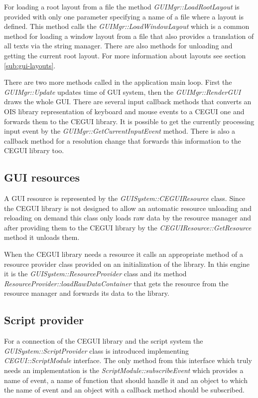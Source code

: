For loading a root layout from a file the method \emph{GUIMgr::LoadRootLayout} is provided with only one parameter specifying a name of a file where a layout is defined. This method calls the \emph{GUIMgr::LoadWindowLayout} which is a common method for loading a window layout from a file that also provides a translation of all texts via the string manager. There are also methods for unloading and getting the current root layout. For more information about layouts see section \ref{sub:gui-layouts}.

There are two more methods called in the application main loop. First the \emph{GUIMgr::Update} updates time of GUI system, then the \emph{GUIMgr::Render\-GUI} draws the whole GUI. There are several input callback methods that converts an OIS library representation of keyboard and mouse events to a CEGUI one and forwards them to the CEGUI library. It is possible to get the currently processing input event by the \emph{GUIMgr::GetCurrentInputEvent} method. There is also a callback method for a resolution change that forwards this information to the CEGUI library too.

\subsection{GUI resources}
\label{sub:gui-resources}

A GUI resource is represented by the \emph{GUISystem::CEGUIResource} class. Since the CEGUI library is not designed to allow an automatic resource unloading and reloading on demand this class only loads raw data by the resource manager and after providing them to the CEGUI library by the \emph{CEGUIResource::GetResource} method it unloads them.

When the CEGUI library needs a resource it calls an appropriate method of a resource provider class provided on an initialization of the library. In this engine it is the \emph{GUISystem::ResourceProvider} class and its method \emph{ResourceProvider::loadRawDataContainer} that gets the resource from the resource manager and forwards its data to the library.

\subsection{Script provider}
\label{sub:gui-script}

For a connection of the CEGUI library and the script system the \emph{GUISystem::ScriptProvider} class is introduced implementing \emph{CEGUI::ScriptModule} interface. The only method from this interface which truly needs an implementation is the \emph{ScriptModule::subscribeEvent} which provides a name of event, a name of function that should handle it and an object to which the name of event and an object with a callback method should be subscribed.

